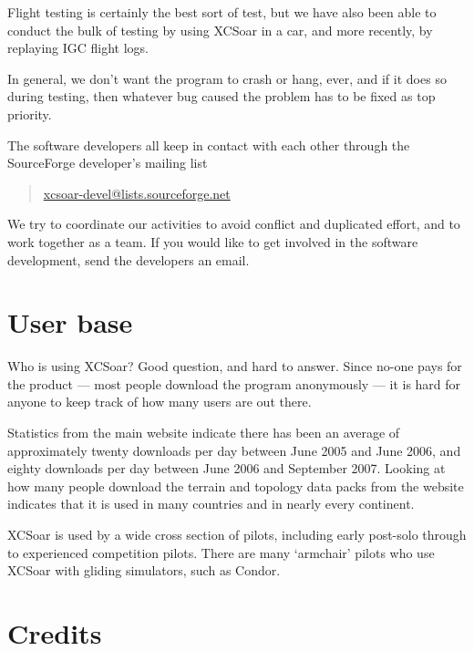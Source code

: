 \documentclass[a4paper,12pt]{refrep}
\begin{document}
Flight testing is certainly the best sort of test, but we have also
been able to conduct the bulk of testing by using XCSoar in a car,
and more recently, by replaying IGC flight logs.

In general, we don't want the program to crash or hang, ever, and if
it does so during testing, then whatever bug caused the problem has to
be fixed as top priority.

The software developers all keep in contact with each other through
the SourceForge developer's mailing list
\begin{quote}
\url{xcsoar-devel@lists.sourceforge.net}
\end{quote}
We try to coordinate our activities to avoid conflict and duplicated
effort, and to work together as a team.  If you would like to get
involved in the software development, send the developers an email.

\section{User base}

Who is using XCSoar?  Good question, and hard to answer.  Since no-one
pays for the product --- most people download the program anonymously
--- it is hard for anyone to keep track of how many users are out
there.

Statistics from the main website indicate there has been an average of
approximately twenty downloads per day between June 2005 and June
2006, and eighty downloads per day between June 2006 and September
2007.  Looking at how many people download the terrain and topology
data packs from the website indicates that it is used in many
countries and in nearly every continent.

XCSoar is used by a wide cross section of pilots, including early
post-solo through to experienced competition pilots.  There are many
`armchair' pilots who use XCSoar with gliding simulators, such as
Condor.

\section{Credits}
\end{document}
